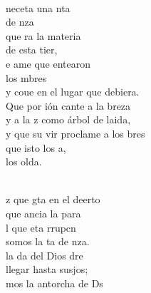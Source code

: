 \begin{cancion}%
	     \chord{(}{**)}{    }\\
	 neceta una nta \\
	de nza     \\
	que ra la materia \\
	de esta tier,   \\
	e ame  que entearon \\
	los mbres   \\
	y coue en el lugar que debiera.\\
	Que por ión cante a la breza\\
	y a la z como árbol de laida,\\
	y que su vir proclame a los bres\\
	que isto los a,\\
	los olda.  \\\jump\\
	\begin{chorus}%
	z que gta en el deerto  \\
	 que ancia la para\\
	l que eta rrupcn \\
	somos la ta de nza.   \\
	 la da del Dios dre   \\
	 llegar hasta susjos;\\
	mos la antorcha de Ds\\

\end{chorus}
\end{cancion}
